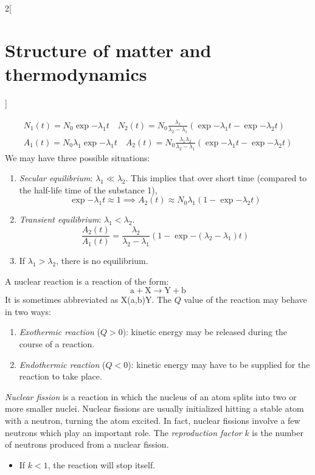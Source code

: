 \documentclass[../../../main.tex]{subfiles}
\begin{document}
\begin{multicols}{2}[\section{Structure of matter and thermodynamics}]
\begin{proposition}
    \begin{gather*}
      N_1(t)=N_0\exp{-\lambda_1t}\quad N_2(t) =N_0\frac{\lambda_1}{\lambda_2-\lambda_1}\left(\exp{-\lambda_1t}-\exp{-\lambda_2t}\right)         \\
      A_1(t)=N_0\lambda_1\exp{-\lambda_1t}\quad A_2(t)=N_0\frac{\lambda_1\lambda_2}{\lambda_2-\lambda_1}\left(\exp{-\lambda_1t}-\exp{-\lambda_2t}\right)
    \end{gather*}
    We may have three possible situations:
    \begin{enumerate}
      \item \emph{Secular equilibrium}: $\lambda_1\ll\lambda_2$. This implies that over short time (compared to the half-life time of the substance 1), $$\exp{-\lambda_1 t}\approx 1\implies A_2(t)\approx N_0\lambda_1(1-\exp{-\lambda_2t})$$
      \item \emph{Transient equilibrium}: $\lambda_1<\lambda_2$.
            $$\frac{A_2(t)}{A_1(t)}=\frac{\lambda_2}{\lambda_2-\lambda_1}\left(1-\exp{-(\lambda_2-\lambda_1)t}\right)$$
      \item If $\lambda_1>\lambda_2$, there is no equilibrium.
    \end{enumerate}
  \end{proposition}
  \begin{definition}
    A nuclear reaction is a reaction of the form:
    $$\text{a}+\text{X}\rightarrow\text{Y}+\text{b}$$
    It is sometimes abbreviated as X(a,b)Y. The $Q$ value of the reaction may behave in two ways:
    \begin{enumerate}
      \item \emph{Exothermic reaction} ($Q>0$): kinetic energy may be released during the course of a reaction.
      \item \emph{Endothermic reaction} ($Q<0$): kinetic energy may have to be supplied for the reaction to take place.
    \end{enumerate}
  \end{definition}
  \begin{definition}
    \emph{Nuclear fission} is a reaction in which the nucleus of an atom splits into two or more smaller nuclei. Nuclear fissions are usually initialized hitting a stable atom with a neutron, turning the atom excited. In fact, nuclear fissions involve a few neutrons which play an important role. The \emph{reproduction factor} $k$ is the number of neutrons produced from a nuclear fission.
    \begin{itemize}
      \item If $k<1$, the reaction will stop itself.

\end{itemize}
\end{definition}
\end{multicols}
\end{document}
